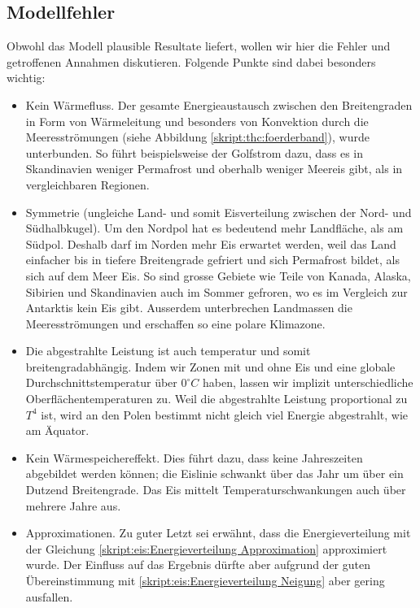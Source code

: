 \begin{refsection}
\section{Modellfehler}
Obwohl das Modell plausible Resultate liefert, wollen wir hier die Fehler und getroffenen Annahmen diskutieren. Folgende Punkte sind dabei besonders wichtig:
\begin{itemize}
	\item Kein Wärmefluss. Der gesamte Energieaustausch zwischen den Breitengraden in Form von Wärmeleitung und besonders von Konvektion durch die Meeresströmungen (siehe Abbildung \ref{skript:thc:foerderband}), wurde unterbunden. So führt beispielsweise der Golfstrom dazu, dass es in Skandinavien weniger Permafrost und oberhalb weniger Meereis gibt, als in vergleichbaren Regionen.
	\item Symmetrie (ungleiche Land- und somit Eisverteilung zwischen der Nord- und Südhalbkugel). Um den Nordpol hat es bedeutend mehr Landfläche, als am Südpol. Deshalb darf im Norden mehr Eis erwartet werden, weil das Land einfacher bis in tiefere Breitengrade gefriert und sich Permafrost bildet, als sich auf dem Meer Eis. So sind grosse Gebiete wie Teile von Kanada, Alaska, Sibirien und Skandinavien auch im Sommer gefroren, wo es im Vergleich zur Antarktis kein Eis gibt. Ausserdem unterbrechen Landmassen die Meeresströmungen und erschaffen so eine polare Klimazone.
	\item Die abgestrahlte Leistung ist auch temperatur und somit breitengradabhängig. Indem wir Zonen mit und ohne Eis und eine globale Durchschnittstemperatur über $0^\circ C$ haben, lassen wir implizit unterschiedliche Oberflächentemperaturen zu. Weil die abgestrahlte Leistung proportional zu $T^4$ ist, wird an den Polen bestimmt nicht gleich viel Energie abgestrahlt, wie am Äquator.
	\item Kein Wärmespeichereffekt. Dies führt dazu, dass keine Jahreszeiten abgebildet werden können; die Eislinie schwankt über das Jahr um über ein Dutzend Breitengrade. Das Eis mittelt Temperaturschwankungen auch über mehrere Jahre aus.
	\item Approximationen. Zu guter Letzt sei erwähnt, dass die Energieverteilung mit der Gleichung \eqref{skript:eis:Energieverteilung Approximation} approximiert wurde. Der Einfluss auf das Ergebnis dürfte aber aufgrund der guten Übereinstimmung mit \eqref{skript:eis:Energieverteilung Neigung} aber gering ausfallen.
\end{itemize}

\end{refsection}
